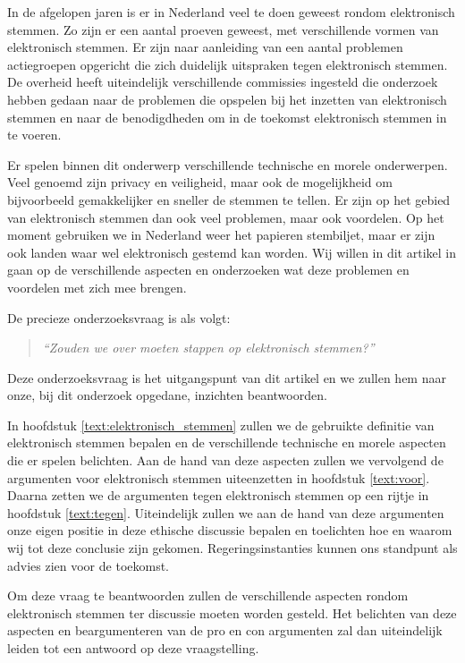 \documentclass[a4paper]{article}
\begin{document}
In de afgelopen jaren is er in Nederland veel te doen geweest rondom elektronisch stemmen.
Zo zijn er een aantal proeven geweest, met verschillende vormen van elektronisch stemmen.
Er zijn naar aanleiding van een aantal problemen actiegroepen opgericht die zich duidelijk uitspraken tegen elektronisch stemmen.
De overheid heeft uiteindelijk verschillende commissies ingesteld die onderzoek hebben gedaan naar de problemen die opspelen bij het inzetten van elektronisch stemmen en naar de benodigdheden om in de toekomst elektronisch stemmen in te voeren.

Er spelen binnen dit onderwerp verschillende technische en morele onderwerpen.
Veel genoemd zijn privacy en veiligheid, maar ook de mogelijkheid om bijvoorbeeld gemakkelijker en sneller de stemmen te tellen.
Er zijn op het gebied van elektronisch stemmen dan ook veel problemen, maar ook voordelen.
Op het moment gebruiken we in Nederland weer het papieren stembiljet, maar er zijn ook landen waar wel elektronisch gestemd kan worden.
Wij willen in dit artikel in gaan op de verschillende aspecten en onderzoeken wat deze problemen en voordelen met zich mee brengen.

De precieze onderzoeksvraag is als volgt:
\begin{quote}
\emph{``Zouden we over moeten stappen op elektronisch stemmen?''}
\end{quote}
Deze onderzoeksvraag is het uitgangspunt van dit artikel en we zullen hem naar onze, bij dit onderzoek opgedane, inzichten beantwoorden. 

In hoofdstuk \ref{text:elektronisch_stemmen} zullen we de gebruikte definitie van elektronisch stemmen bepalen en de verschillende technische en morele aspecten die er spelen belichten.
Aan de hand van deze aspecten zullen we vervolgend de argumenten voor elektronisch stemmen uiteenzetten in hoofdstuk \ref{text:voor}.
Daarna zetten we de argumenten tegen elektronisch stemmen op een rijtje in hoofdstuk \ref{text:tegen}.
Uiteindelijk zullen we aan de hand van deze argumenten onze eigen positie in deze ethische discussie bepalen en toelichten hoe en waarom wij tot deze conclusie zijn gekomen. 
Regeringsinstanties kunnen ons standpunt als advies zien voor de toekomst. 



Om deze vraag te beantwoorden zullen de verschillende aspecten rondom elektronisch stemmen ter discussie moeten worden gesteld.
Het belichten van deze aspecten en beargumenteren van de pro en con argumenten zal dan uiteindelijk leiden tot een antwoord op deze vraagstelling.
\end{document}
